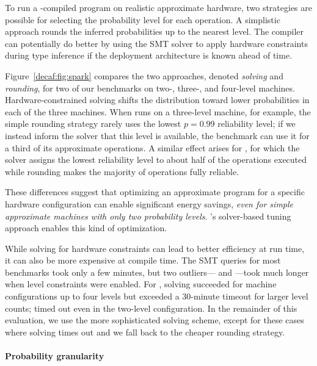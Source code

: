 To run a \lang-compiled program on realistic approximate hardware, two
strategies are possible for selecting the probability level for each operation.
A simplistic approach rounds the inferred probabilities up to the nearest
level.
The compiler can potentially do better by using the SMT solver to apply hardware
constraints during type inference if the deployment architecture is known
ahead of time.

Figure~\ref{decaf:fig:spark} compares the two approaches, denoted \emph{solving} and
\emph{rounding},
for two of
our benchmarks on \mbox{two-,} \mbox{three-,} and four-level machines.
Hardware-constrained solving shifts the distribution toward lower
probabilities in each of the three machines.
When  runs on a three-level machine, for example, the simple
rounding strategy rarely uses the lowest $p=0.99$ reliability level;
if we instead inform the solver that this level is available, the benchmark
can use it for a third of its approximate operations.
A similar effect arises for , for which the solver assigns the
lowest reliability level to about half of the operations executed while
rounding makes the majority of operations fully reliable.

These differences suggest that optimizing an approximate program for a
specific hardware configuration can enable significant energy savings,
\emph{even for simple approximate machines with only two probability levels}.
\lang's solver-based tuning approach enables this kind of
optimization.

While solving for hardware constraints can lead to better efficiency at run
time, it can also be more expensive at compile time.
The SMT queries for most benchmarks took only a few minutes,
but two outliers--- and ---took much longer when level constraints
were enabled.
For , solving succeeded for machine configurations up to four levels
but exceeded a 30-minute timeout for larger level counts;
 timed out even in the two-level configuration.
In the remainder of this evaluation, we use the more sophisticated solving
scheme, except for these cases where solving times out and we fall back to the
cheaper rounding strategy.


\paragraph{Probability granularity}


